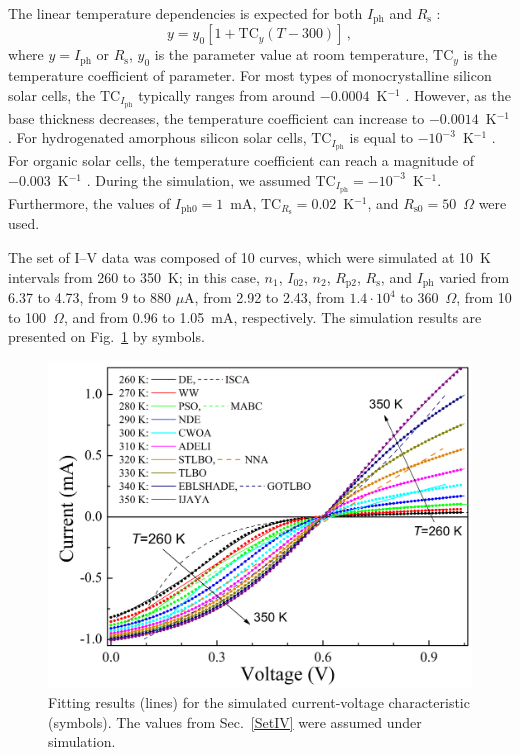 \documentclass[a4paper,fleqn]{cas-sc}
\begin{document}
The linear temperature dependencies is expected for both $I_\mathrm{ph}$ \cite{Green2003,Eberle2021} and $R_\mathrm{s}$ \cite{Ibrahim2017,Bradaschia2019}:
\begin{equation}
y=y_{0}[1+\mathrm{TC}_y(T-300)]\,,
\end{equation}
where
$y=I_\mathrm{ph}$ or $R_\mathrm{s}$,
$y_0$ is the parameter value at room temperature,
$\mathrm{TC}_y$ is the temperature coefficient of parameter.
For most types of monocrystalline silicon solar cells, the $\mathrm{TC}_{I_\mathrm{ph}}$ typically ranges from around $-0.0004$~K$^{-1}$ \cite{TuanLe2021}.
However, as the base thickness decreases, the temperature coefficient can increase to $-0.0014$~K$^{-1}$ \cite{Dupre2016}.
For hydrogenated amorphous silicon solar cells, $\mathrm{TC}_{I_\mathrm{ph}}$ is equal to $-10^{-3}$~K$^{-1}$ \cite{Riesen2016}.
For organic solar cells, the temperature coefficient can reach a magnitude of $-0.003$~K$^{-1}$ \cite{Rana2018}.
During the simulation, we assumed $\mathrm{TC}_{I_\mathrm{ph}}=-10^{-3}$~K$^{-1}$.
Furthermore, the values of $I_\mathrm{ph0}=1$~mA,
$\mathrm{TC}_{R_\mathrm{s}}=0.02$~K$^{-1}$,
and $R_\mathrm{s0}=50$~$\Omega$ were used.



The set of I–V data was composed of 10 curves,
which were simulated at 10~K intervals from 260 to 350~K;
in this case,
$n_1$,
$I_{02}$,
$n_2$,
$R_\mathrm{p2}$,
$R_\mathrm{s}$,
and $I_\mathrm{ph}$
varied
from 6.37 to 4.73,
from 9 to 880 $\mu$A,
from 2.92 to 2.43,
from $1.4\cdot10^4$ to 360~$\Omega$,
from 10 to 100~$\Omega$,
and from 0.96 to 1.05~mA, respectively.
The simulation results are presented on Fig.~\ref{figSetIV} by symbols.
\begin{figure}[]
	\centering
		\includegraphics[width=0.5\columnwidth]{IVset}
	  \caption{Fitting results (lines) for the simulated current-voltage characteristic (symbols).
             The values from  Sec.~\ref{SetIV} were assumed under simulation.}\label{figSetIV}
\end{figure}
\end{document}
